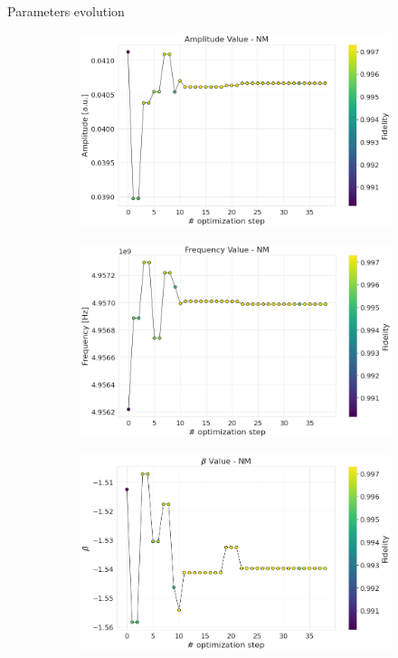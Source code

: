 \documentclass[aspectratio=169,10pt]{beamer}
\begin{document}
\begin{frame}[t,fragile]{Parameters evolution}
  \begin{figure}
    \begin{subfigure}[t]{0.315\textwidth}
      \includegraphics[width=\textwidth]{figures/NM_amplitude.png}
    \end{subfigure}
        \begin{subfigure}[t]{0.315\textwidth}
      \includegraphics[width=\textwidth]{figures/NM_frequency.png}
    \end{subfigure}
        \begin{subfigure}[t]{0.315\textwidth}
      \includegraphics[width=\textwidth]{figures/NM_beta.png}
    \end{subfigure}


\end{figure}
\end{frame}
\end{document}
